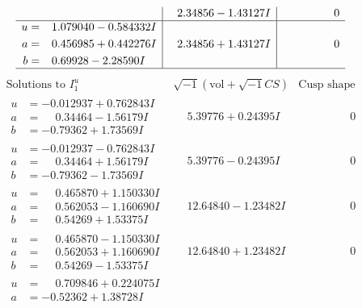 \documentclass[1p]{elsarticle_modified}
\theoremstyle{definition}
\newcommand{\I}{\sqrt{-1}}
\begin{document}
$$\begin{array}{c|c|c}
 & \phantom{-}2.34856 - 1.43127 I & \phantom{-0.000000 } 0 \\ \hline\begin{aligned}
u &= \phantom{-}1.079040 - 0.584332 I \\
a &= \phantom{-}0.456985 + 0.442276 I \\
b &= \phantom{-}0.69928 - 2.28590 I\end{aligned}
 & \phantom{-}2.34856 + 1.43127 I & \phantom{-0.000000 } 0\\
 \hline 
 \end{array}$$\newpage$$\begin{array}{c|c|c}  
\text{Solutions to }I^u_{1}& \I (\text{vol} + \sqrt{-1}CS) & \text{Cusp shape}\\
 \hline 
\begin{aligned}
u &= -0.012937 + 0.762843 I \\
a &= \phantom{-}0.34464 - 1.56179 I \\
b &= -0.79362 + 1.73569 I\end{aligned}
 & \phantom{-}5.39776 + 0.24395 I & \phantom{-0.000000 } 0 \\ \hline\begin{aligned}
u &= -0.012937 - 0.762843 I \\
a &= \phantom{-}0.34464 + 1.56179 I \\
b &= -0.79362 - 1.73569 I\end{aligned}
 & \phantom{-}5.39776 - 0.24395 I & \phantom{-0.000000 } 0 \\ \hline\begin{aligned}
u &= \phantom{-}0.465870 + 1.150330 I \\
a &= \phantom{-}0.562053 - 1.160690 I \\
b &= \phantom{-}0.54269 + 1.53375 I\end{aligned}
 & \phantom{-}12.64840 - 1.23482 I & \phantom{-0.000000 } 0 \\ \hline\begin{aligned}
u &= \phantom{-}0.465870 - 1.150330 I \\
a &= \phantom{-}0.562053 + 1.160690 I \\
b &= \phantom{-}0.54269 - 1.53375 I\end{aligned}
 & \phantom{-}12.64840 + 1.23482 I & \phantom{-0.000000 } 0 \\ \hline\begin{aligned}
u &= \phantom{-}0.709846 + 0.224075 I \\
a &= -0.52362 + 1.38728 I \\

\end{aligned}
\end{array}$$
\end{document}
